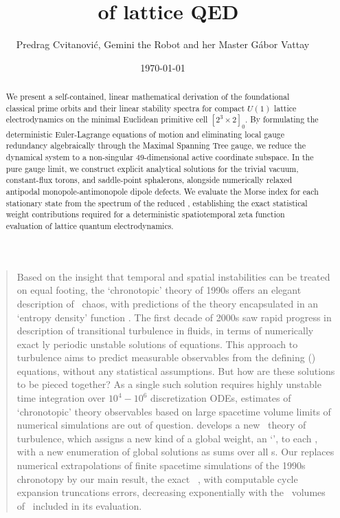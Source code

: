 \documentclass[11pt,a4paper]{article}
\title{\Dft\ of lattice QED}
\author{Predrag Cvitanovi\'{c}, Gemini the Robot and her Master G{\'a}bor Vattay}
\date{\today}
\begin{document}
	
\maketitle
\tableofcontents

\begin{abstract}
We present a self-contained, linear mathematical derivation of the foundational classical prime orbits and their linear stability spectra for compact $U(1)$ lattice electrodynamics on the minimal Euclidean primitive cell $[2^3 \times 2]_0$. By formulating the deterministic Euler-Lagrange equations of motion and eliminating local gauge redundancy algebraically through the Maximal Spanning Tree gauge, we reduce the dynamical system to a non-singular 49-dimensional active coordinate subspace. In the pure gauge limit, we construct explicit analytical solutions for the trivial vacuum, constant-flux torons, and saddle-point sphalerons, alongside numerically relaxed antipodal monopole-antimonopole dipole defects. We evaluate the Morse index for each stationary state from the spectrum of the reduced {\jacobianOrb}, establishing the exact statistical weight contributions required for a deterministic spatiotemporal zeta function evaluation of lattice quantum electrodynamics.
\end{abstract}

\begin{quotation}
	Based on the insight that temporal and spatial instabilities can be 
		treated on equal footing, the `chronotopic' theory of 1990s offers an 
		elegant description of  \spt\ chaos, with predictions of the theory 
		encapsulated in an `entropy density' function%
.
		The first decade of 2000s saw rapid progress in description of 
		transitional turbulence in fluids, in terms of 
		numerically exact {\spt}ly periodic unstable solutions of {\NS} equations.%
		This approach to turbulence aims to predict measurable observables from 
		the defining (\NS) equations, without any statistical assumptions. 
		But how are these solutions to be pieced together?%
		As a single such solution requires highly unstable time integration over 
		$10^4-10^6$ discretization ODEs, estimates of `chronotopic' theory 
		observables based on large spacetime volume limits of numerical 
		simulations are out of question. 
 develops a new \spt\ theory of turbulence, which
		assigns a new kind of a global weight, an `\Hilldet', to each {\lst},
		with a new enumeration of global solutions as sums over all {\Blatt}s. 
		Our {\dft} replaces numerical extrapolations of finite spacetime 
		simulations of the 1990s chronotopy by our main result, 
		the {exact} \spt\ {\detZeta}, with computable cycle expansion truncations 
		errors, decreasing exponentially with the \spt\ volumes of \lsts\ 
		included in its evaluation.  
\end{quotation}
\end{document}
